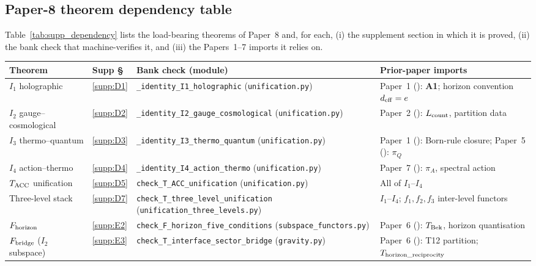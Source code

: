 \documentclass[11pt]{article}
\theoremstyle{plain}
\theoremstyle{definition}
\theoremstyle{remark}
\newcommand{\Aone}{\textbf{A1}}
\newcommand{\paperref}[2]{Paper~#1 (\emph{#2})}
\begin{document}
\bigskip

\subsection{Paper-8 theorem dependency table}\label{supp:B_table}

Table~\ref{tab:supp_dependency} lists the load-bearing theorems of Paper~8 and, for each, (i) the supplement section in which it is proved, (ii) the bank check that machine-verifies it, and (iii) the Papers~1--7 imports it relies on.

\begin{table}[h]
\centering
\footnotesize
\setlength{\tabcolsep}{4pt}
\begin{tabularx}{\textwidth}{@{}l l X X@{}}
\toprule
\textbf{Theorem} & \textbf{Supp \S} & \textbf{Bank check (module)} & \textbf{Prior-paper imports} \\
\midrule
$I_1$ holographic                   & \ref{supp:D1} & \texttt{\_identity\_I1\_holographic} (\texttt{unification.py})   & \paperref{1}{}: \Aone{}; horizon convention $d_{\rm eff} = e$ \\
\addlinespace[2pt]
$I_2$ gauge--cosmological           & \ref{supp:D2} & \texttt{\_identity\_I2\_gauge\_cosmological} (\texttt{unification.py}) & \paperref{2}{}: $L_{\rm count}$, partition data \\
\addlinespace[2pt]
$I_3$ thermo--quantum               & \ref{supp:D3} & \texttt{\_identity\_I3\_thermo\_quantum} (\texttt{unification.py}) & \paperref{1}{}: Born-rule closure; \paperref{5}{}: $\pi_Q$ \\
\addlinespace[2pt]
$I_4$ action--thermo                & \ref{supp:D4} & \texttt{\_identity\_I4\_action\_thermo} (\texttt{unification.py}) & \paperref{7}{}: $\pi_A$, spectral action \\
\addlinespace[2pt]
$T_{\rm ACC}$ unification           & \ref{supp:D5} & \texttt{check\_T\_ACC\_unification} (\texttt{unification.py}) & All of $I_1$--$I_4$ \\
\addlinespace[3pt]
Three-level stack                   & \ref{supp:D7} & \texttt{check\_T\_three\_level\_unification} (\texttt{unification\_three\_levels.py}) & $I_1$--$I_4$; $f_1, f_2, f_3$ inter-level functors \\
\addlinespace[2pt]
$F_{\rm horizon}$                   & \ref{supp:E2} & \texttt{check\_F\_horizon\_five\_conditions} (\texttt{subspace\_functors.py}) & \paperref{6}{}: $T_{\rm Bek}$, horizon quantisation \\
$F_{\rm bridge}$ ($I_2$ subspace)    & \ref{supp:E3} & \texttt{check\_T\_interface\_sector\_bridge} (\texttt{gravity.py})     & \paperref{6}{}: T12 partition; $T_{\rm horizon\_reciprocity}$ \\

\end{tabularx}
\end{table}
\end{document}
